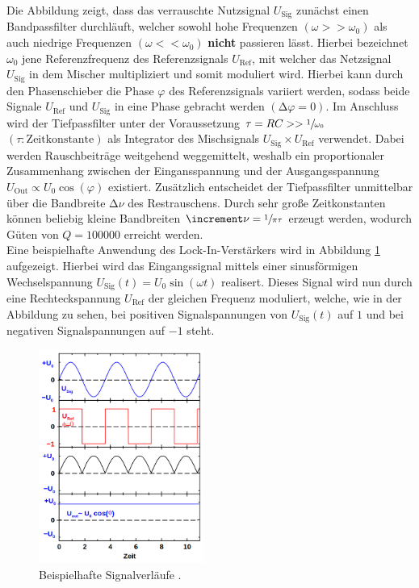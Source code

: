 \noindent Die Abbildung zeigt, dass das verrauschte Nutzsignal $U_\text{Sig}$ zunächst einen Bandpassfilter durchläuft,
welcher sowohl hohe Frequenzen $\left(\omega >> \omega_0\right)$ als auch niedrige Frequenzen $\left(\omega << \omega_0\right)$
\textbf{nicht} passieren lässt. Hierbei bezeichnet $\omega_0$ jene Referenzfrequenz des Referenzsignals $U_\text{Ref}$, mit welcher 
das Netzsignal $U_\text{Sig}$ in dem Mischer multipliziert und somit moduliert wird. Hierbei kann durch den Phasenschieber die Phase  
$\varphi$ des Referenzsignals variiert werden, sodass beide Signale $U_\text{Ref}$ und $U_\text{Sig}$ in eine Phase gebracht werden 
$\left(\increment \varphi = 0\right)$. Im Anschluss wird der Tiefpassfilter unter der Voraussetzung $\tau = RC >> \sfrac{1}{\omega_0}$ 
$\left(\tau: \text{Zeitkonstante}\right)$ als Integrator des Mischsignals $U_\text{Sig} \times U_\text{Ref}$ verwendet. Dabei werden 
Rauschbeiträge weitgehend weggemittelt, weshalb ein proportionaler Zusammenhang zwischen der Eingansspannung und der Ausgangsspannung $U_\text{Out} \propto U_0\cos(\varphi)$ 
existiert. Zusätzlich entscheidet der Tiefpassfilter unmittelbar über die Bandbreite $\increment\nu$ des
Restrauschens. Durch sehr große Zeitkonstanten können beliebig kleine Bandbreiten $\increment\nu = \sfrac{1}{\pi\tau}$ erzeugt werden,
wodurch Güten von $Q = \num{100000}$ erreicht werden.\\
Eine beispielhafte Anwendung des Lock-In-Verstärkers wird in Abbildung \ref{fig:AWD} aufgezeigt. Hierbei wird das Eingangssignal 
mittels einer sinusförmigen Wechselspannung $U_\text{Sig}(t) = U_{0}\sin(\omega t)$ realisert. Dieses Signal wird nun durch eine
Rechteckspannung $U_\text{Ref}$ der gleichen Frequenz moduliert, welche, wie in der Abbildung zu sehen, bei positiven Signalspannungen
von $U_\text{Sig}(t)$ auf $1$ und bei negativen Signalspannungen auf $-1$ steht.

\begin{figure}
    \centering
    \includegraphics[height=7cm]{./content/AWD.png}
    \caption{Beispielhafte Signalverläufe \cite{Versuchsanleitung_v303}.}
    \label{fig:AWD}
\end{figure}

